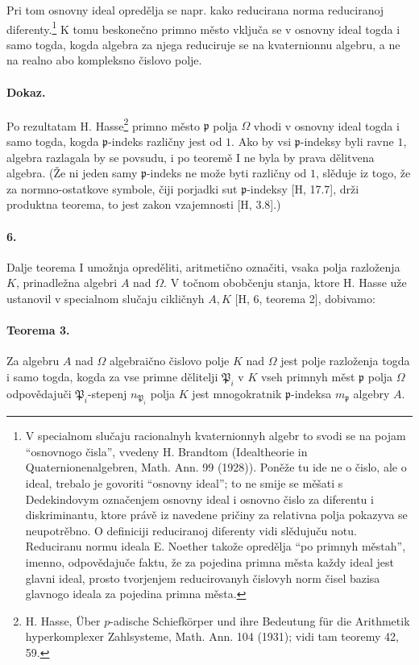 \documentclass[11pt]{article}
\newcommand{\foreign}[1]{#1}
\begin{document}
Pri tom osnovny ideal opredělja se napr. kako reducirana norma reduciranoj diferenty.\footnote{V specialnom slučaju racionalnyh kvaternionnyh algebr to svodi se na pojam ``osnovnogo čisla'', vvedeny H. Brandtom (\foreign{Idealtheorie in Quaternionenalgebren, Math. Ann. 99 (1928)}). Poněže tu ide ne o čislo, ale o ideal, trebalo je govoriti ``osnovny ideal''; to ne smije se měšati s Dedekindovym označenjem osnovny ideal i osnovno čislo za diferentu i diskriminantu, ktore právě iz navedene pričiny za relativna polja pokazyva se neupotrěbno. O definiciji reduciranoj diferenty vidi slědujuču notu. Reduciranu normu ideala E. Noether takože opredělja ``po primnyh městah'', imenno, odpovědajuče faktu, že za pojedina primna města každy ideal jest glavni ideal, prosto tvorjenjem reducirovanyh čislovyh norm čisel bazisa glavnogo ideala za pojedina primna města.} K tomu beskonečno primno město vključa se v osnovny ideal togda i samo togda, kogda algebra za njega reduciruje se na kvaternionnu algebru, a ne na realno abo kompleksno čislovo polje.

\paragraph{Dokaz.}
Po rezultatam H. Hasse\footnote{\label{fn:p38-hasse-padisch}\foreign{H. Hasse, Über \(p\)-adische Schiefkörper und ihre Bedeutung für die Arithmetik hyperkomplexer Zahlsysteme, Math. Ann. 104 (1931)}; vidi tam teoremy 42, 59.} primno město \(\mathfrak p\) polja \(\Omega\) vhodi v osnovny ideal togda i samo togda, kogda \( \mathfrak p\)-indeks različny jest od \(1\). Ako by vsi \( \mathfrak p\)-indeksy byli ravne \(1\), algebra razlagala by se povsudu, i po teoremě I ne byla by prava dělitvena algebra. (Že ni jeden samy \( \mathfrak p\)-indeks ne može byti različny od \(1\), slěduje iz togo, že za normno-ostatkove symbole, čiji porjadki sut \( \mathfrak p\)-indeksy [H, 17.7], drži produktna teorema, to jest zakon vzajemnosti [H, 3.8].)

\paragraph{6.}
Dalje teorema I umožnja opreděliti, aritmetično označiti, vsaka polja razloženja \(K\), prinadležna algebri \(A\) nad \(\Omega\). V točnom obobčenju stanja, ktore H. Hasse uže ustanovil v specialnom slučaju cikličnyh \(A,K\) [H, 6, teorema 2], dobivamo:

\paragraph{Teorema 3.}
Za algebru \(A\) nad \(\Omega\) algebraično čislovo polje \(K\) nad \(\Omega\) jest polje razloženja togda i samo togda, kogda za vse primne dělitelji \(\mathfrak P_i\) v \(K\) vseh primnyh měst \(\mathfrak p\) polja \(\Omega\) odpovědajuči \( \mathfrak P_i\)-stepenj \(n_{\mathfrak P_i}\) polja \(K\) jest mnogokratnik \( \mathfrak p\)-indeksa \(m_{\mathfrak p}\) algebry \(A\).
\end{document}
